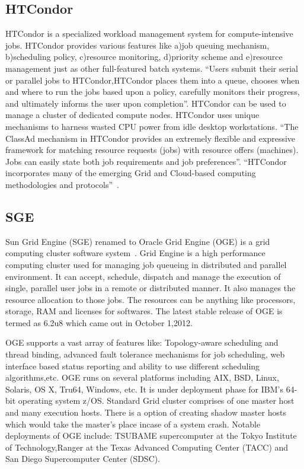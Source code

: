 {     \pv

     
\subsection{HTCondor}

    
HTCondor is a specialized workload management system for
compute-intensive jobs.  HTCondor provides various features like a)job
queuing mechanism, b)scheduling policy, c)resource monitoring,
d)priority scheme and e)resource management just as other
full-featured batch systems.  ``Users submit their serial or parallel
jobs to HTCondor,HTCondor places them into a queue, chooses when and
where to run the jobs based upon a policy, carefully monitors their
progress, and ultimately informs the user upon completion''.  HTCondor
can be used to manage a cluster of dedicated compute nodes. HTCondor
uses unique mechanisms to harness wasted CPU power from idle desktop
workstations. ``The ClassAd mechanism in HTCondor provides an
extremely flexible and expressive framework for matching resource
requests (jobs) with resource offers (machines).  Jobs can easily
state both job requirements and job preferences''.  ``HTCondor
incorporates many of the emerging Grid and Cloud-based computing
methodologies and protocols''~\cite{htcondor}.

     \pv

     
\subsection{SGE}

Sun Grid Engine (SGE) renamed to Oracle Grid Engine (OGE) is a grid
computing cluster software system~\cite{www-sge-wiki}. Grid Engine is
a high performance computing cluster used for managing job queueing in
distributed and parallel environment. It can accept, schedule,
dispatch and manage the execution of single, parallel user jobs in a
remote or distributed manner. It also manages the resource allocation
to those jobs. The resources can be anything like processors, storage,
RAM and licenses for softwares. The latest stable release of OGE is
termed as 6.2u8 which came out in October 1,2012.

     OGE supports a vast array of features like: Topology-aware
     scheduling and thread binding, advanced fault tolerance
     mechanisms for job scheduling, web interface based status
     reporting and ability to use different scheduling
     algorithms,etc. OGE runs on several platforms including AIX, BSD,
     Linux, Solaris, OS X, Tru64, Windows, etc. It is under deployment
     phase for IBM's 64-bit operating system z/OS. Standard Grid
     cluster comprises of one master host and many execution
     hosts. There is a option of creating shadow master hosts which
     would take the master's place incase of a system crash. Notable
     deployments of OGE include: TSUBAME supercomputer at the Tokyo
     Institute of Technology,Ranger at the Texas Advanced Computing
     Center (TACC) and San Diego Supercomputer Center (SDSC).

}
